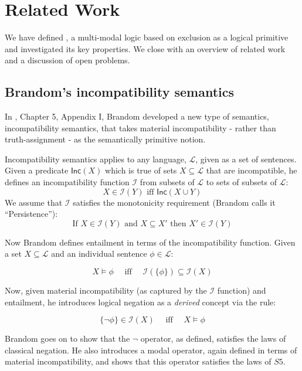 \section{Related Work}\label{relatedWork}

We have defined \cathoristic{}, a multi-modal logic based on
exclusion as a logical primitive and investigated its key properties.
We close with an overview of related work and a discussion of 
open problems.



\subsection{Brandom's incompatibility semantics}
\NI In \cite{brandom}, Chapter 5, Appendix I, Brandom developed a new
type of semantics, incompatibility semantics, that takes material
incompatibility - rather than truth-assignment - as the semantically
primitive notion.

Incompatibility semantics applies to any language, $\mathcal{L}$,
given as a set of sentences.  Given a predicate $\mathsf{Inc}(X)$
which is true of sets $X \subseteq \mathcal{L}$ that are incompatible,
he defines an incompatibility function $\mathcal{I}$ from subsets of
$\mathcal{L}$ to sets of subsets of $\mathcal{L}$:
\[
X \in \mathcal{I}(Y) \text{ iff } \mathsf{Inc}(X \cup Y)
\]
We assume that $\mathcal{I}$ satisfies the
monotonicity requirement (Brandom calls it ``Persistence''):
\[
   \text{If } X \in \mathcal{I}(Y) \text{ and } X \subseteq X' \text{ then } X' \in \mathcal{I}(Y)
\]

\NI Now Brandom defines entailment in terms of the incompatibility
function. Given a set $X \subseteq \mathcal{L}$ and an individual
sentence $\phi \in \mathcal{L}$:

\[
   X \models \phi\quad \text{ iff }\quad \mathcal{I}(\{\phi\}) \subseteq \mathcal{I}(X)
\]

\NI Now, given material incompatibility (as captured by the
$\mathcal{I}$ function) and entailment, he introduces logical negation
as a \emph{derived} concept via the rule:

\[
   \{\neg \phi\} \in \mathcal{I}(X)\quad \text{ iff }\quad X \models \phi
\]

\NI Brandom goes on to show that the $\neg$ operator, as defined, satisfies
the laws of classical negation.  He also introduces a modal operator,
again defined in terms of material incompatibility, and shows that
this operator satisfies the laws of $S5$.

